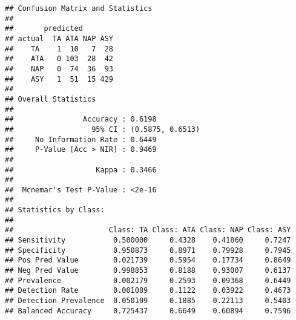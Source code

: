 \documentclass[
]{article}
\newenvironment{Shaded}{\begin{snugshade}}{\end{snugshade}}
\newcommand{\AttributeTok}[1]{\textcolor[rgb]{0.77,0.63,0.00}{#1}}
\newcommand{\CommentTok}[1]{\textcolor[rgb]{0.56,0.35,0.01}{\textit{#1}}}
\newcommand{\DecValTok}[1]{\textcolor[rgb]{0.00,0.00,0.81}{#1}}
\newcommand{\FunctionTok}[1]{\textcolor[rgb]{0.00,0.00,0.00}{#1}}
\newcommand{\NormalTok}[1]{#1}
\newcommand{\OtherTok}[1]{\textcolor[rgb]{0.56,0.35,0.01}{#1}}
\newcommand{\SpecialCharTok}[1]{\textcolor[rgb]{0.00,0.00,0.00}{#1}}
\begin{document}
\begin{verbatim}
## Confusion Matrix and Statistics
## 
##       predicted
## actual  TA ATA NAP ASY
##    TA    1  10   7  28
##    ATA   0 103  28  42
##    NAP   0  74  36  93
##    ASY   1  51  15 429
## 
## Overall Statistics
##                                           
##                Accuracy : 0.6198          
##                  95% CI : (0.5875, 0.6513)
##     No Information Rate : 0.6449          
##     P-Value [Acc > NIR] : 0.9469          
##                                           
##                   Kappa : 0.3466          
##                                           
##  Mcnemar's Test P-Value : <2e-16          
## 
## Statistics by Class:
## 
##                      Class: TA Class: ATA Class: NAP Class: ASY
## Sensitivity           0.500000     0.4328    0.41860     0.7247
## Specificity           0.950873     0.8971    0.79928     0.7945
## Pos Pred Value        0.021739     0.5954    0.17734     0.8649
## Neg Pred Value        0.998853     0.8188    0.93007     0.6137
## Prevalence            0.002179     0.2593    0.09368     0.6449
## Detection Rate        0.001089     0.1122    0.03922     0.4673
## Detection Prevalence  0.050109     0.1885    0.22113     0.5403
## Balanced Accuracy     0.725437     0.6649    0.60894     0.7596
\end{verbatim}

\begin{Shaded}
\end{Shaded}
\end{document}
